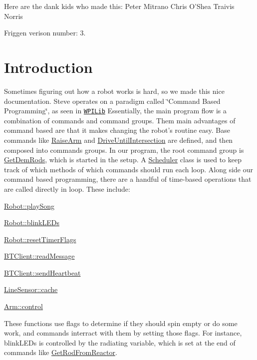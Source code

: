 Here are the dank kids who made this\-:  Peter Mitrano  Chris O'Shea  Traivis Norris

Friggen verison number\-:  3.\hypertarget{index_Introduction}{}\section{Introduction}\label{index_Introduction}
Sometimes figuring out how a robot works is hard, so we made this nice documentation. Steve operates on a paradigm called \char`\"{}\-Command Based Programming\char`\"{}, as seen in \href{https://wpilib.screenstepslive.com/s/4485/m/13809/l/241892-what-is-command-based-programming}{\tt W\-P\-I\-Lib} Essentially, the main program flow is a combination of commands and command groups. Them main advantages of command based are that it makes changing the robot's routine easy. Base commands like \hyperlink{classRaiseArm}{Raise\-Arm} and \hyperlink{classDriveUntilIntersection}{Drive\-Until\-Intersection} are defined, and then composed into commands groups. In our program, the root command group is \hyperlink{classGetDemRods}{Get\-Dem\-Rods}, which is started in the setup. A \hyperlink{classScheduler}{Scheduler} class is used to keep track of which methods of which commands should run each loop. Along side our command based programming, there are a handful of time-\/based operations that are called directly in loop. These include\-:
\begin{DoxyItemize}
\item \hyperlink{classRobot_ad86dbbb2ad0d065f3e4c30fd4b742e1c}{Robot\-::play\-Song}
\item \hyperlink{classRobot_a4215f7e880311c2118f387df75effaf2}{Robot\-::blink\-L\-E\-Ds}
\item \hyperlink{classRobot_ab7c87529c987ede12b934bdfc768507e}{Robot\-::reset\-Timer\-Flags}
\item \hyperlink{classBTClient_a8e827d16926d45a4b7c18dda0e59837b}{B\-T\-Client\-::read\-Message}
\item \hyperlink{classBTClient_a4bf8f58f2c83834cab585e69c55c171f}{B\-T\-Client\-::send\-Heartbeat}
\item \hyperlink{classLineSensor_afc809d2aa49426d949f76f68b0154050}{Line\-Sensor\-::cache}
\item \hyperlink{classArm_a009c19e5b213f692c24eab792cc40c47}{Arm\-::control}
\end{DoxyItemize}

These functions use flags to determine if they should spin empty or do some work, and commands interract with them by setting those flags. For instance, blink\-L\-E\-Ds is controlled by the radiating variable, which is set at the end of commands like \hyperlink{classGetRodFromReactor}{Get\-Rod\-From\-Reactor}. 